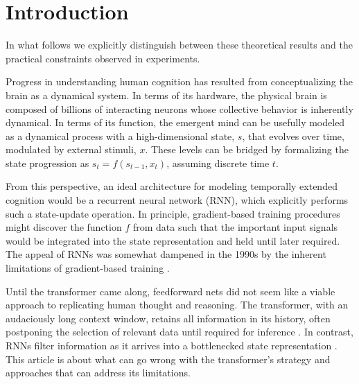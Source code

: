 \documentclass{llmxive}
\begin{document}
\section{Introduction}
In what follows we explicitly distinguish between these theoretical results and the practical constraints observed in experiments.


Progress in understanding human cognition has resulted from conceptualizing the
brain as a dynamical system.
In terms of its hardware, the physical brain is composed of billions of interacting neurons whose collective behavior is inherently dynamical. In terms of its function, the emergent mind can be usefully modeled as a dynamical process with a high-dimensional state, $s$, that evolves over time, modulated by external stimuli, $x$. These levels can be bridged by formalizing the state progression as $s_t= f(s_{t-1}, x_t)$, assuming discrete time $t$.

From this perspective, an ideal architecture for modeling temporally extended cognition would be a recurrent neural network (RNN), which explicitly performs such a state-update operation. In principle, gradient-based training procedures might discover the function $f$ from data such that the important input signals would be integrated into the state representation and held until later required.  The appeal of RNNs was somewhat dampened in the 1990s by the inherent limitations of gradient-based training \citep{mozer1992,hochreiter1998,hochreiter2001}.

Until the transformer \citep{Vaswanietal2017} came along, feedforward nets did not seem like a viable approach to replicating human thought and reasoning.
The transformer, with an audaciously long context window, retains all information in its history, often postponing the selection of relevant data until required for inference \citep{meng2022locating}.
In contrast, RNNs filter information as it arrives into a bottlenecked state
representation \citep{hochreiter1997long}. This article is about what can go wrong with the transformer's strategy and approaches that can address its limitations.
\end{document}
